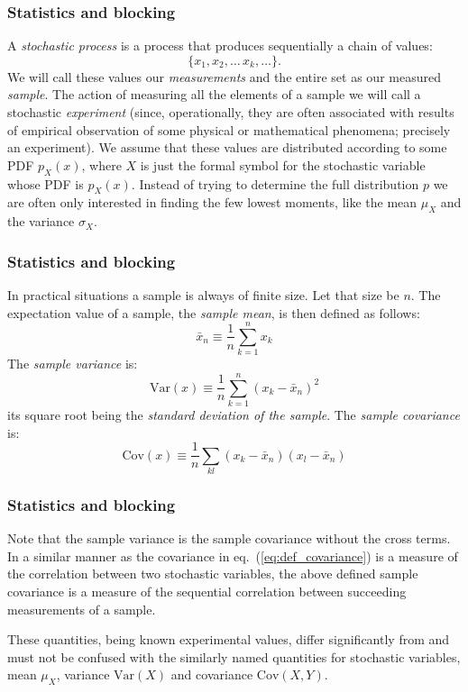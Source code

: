 \documentclass[compress]{beamer}
\newcommand{\bdm}{\begin{displaymath}}
\newcommand{\edm}{\end{displaymath}}
\newcommand{\cov}[0]{\mathrm{Cov}}   %
\newcommand{\var}[0]{\mathrm{Var}}   %
\begin{document}
\frame
{
  \frametitle{Statistics and blocking}
\begin{small}
{\scriptsize
A \emph{stochastic process} is a process that produces sequentially a
chain of values:
\bdm
\{x_1, x_2,\dots\,x_k,\dots\}.
\edm
We will call these
values our \emph{measurements} and the entire set as our measured
\emph{sample}.  The action of measuring all the elements of a sample
we will call a stochastic \emph{experiment} (since, operationally,
they are often associated with results of empirical observation of
some physical or mathematical phenomena; precisely an experiment). We
assume that these values are distributed according to some 
PDF $p_X^{\phantom X}(x)$, where $X$ is just the formal symbol for the
stochastic variable whose PDF is $p_X^{\phantom X}(x)$. Instead of
trying to determine the full distribution $p$ we are often only
interested in finding the few lowest moments, like the mean
$\mu_X^{\phantom X}$ and the variance $\sigma_X^{\phantom X}$.
}
\end{small}
}

\frame
{
  \frametitle{Statistics and blocking}
\begin{small}
{\scriptsize
In practical situations a sample is always of finite size. Let that
size be $n$. The expectation value of a sample, the \emph{sample
mean}, is then defined as follows:
\bdm
\bar x_n \equiv \frac{1}{n}\sum_{k=1}^n x_k
\edm
The \emph{sample variance} is:
\bdm
\var(x) \equiv \frac{1}{n}\sum_{k=1}^n (x_k - \bar x_n)^2
\edm
its square root being the \emph{standard deviation of the sample}. The
\emph{sample covariance} is:
\bdm
\cov(x)\equiv\frac{1}{n}\sum_{kl}(x_k - \bar x_n)(x_l - \bar x_n)
\edm
}
\end{small}
}

\frame
{
  \frametitle{Statistics and blocking}
\begin{small}
{\scriptsize
Note that the sample variance is the sample covariance without the
cross terms. In a similar manner as the covariance in
eq.~(\ref{eq:def_covariance}) is a measure of the correlation between
two stochastic variables, the above defined sample covariance is a
measure of the sequential correlation between succeeding measurements
of a sample.

These quantities, being known experimental values, differ
significantly from and must not be confused with the similarly named
quantities for stochastic variables, mean $\mu_X$, variance $\var(X)$
and covariance $\cov(X,Y)$.
}
\end{small}
}
\end{document}
